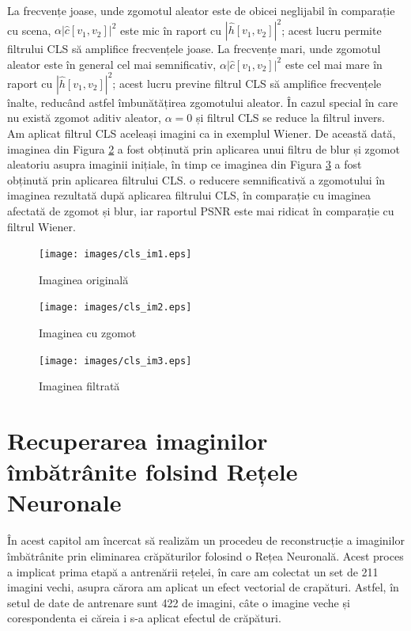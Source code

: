 \documentclass[12pt]{article}
\begin{document}
La frecvențe joase, unde zgomotul aleator este de obicei neglijabil în comparație cu scena, ${\alpha |\hat{c}[v_1, v_2]|^2}$ este mic în raport cu ${|\hat{h}[v_1, v_2]|^2}$; acest lucru permite filtrului CLS să amplifice frecvențele joase. La frecvențe mari, unde zgomotul aleator este în general cel mai semnificativ, ${\alpha |\hat{c}[v_1, v_2]|^2}$ este cel mai mare în raport cu ${|\hat{h}[v_1, v_2]|^2}$; acest lucru previne filtrul CLS să amplifice frecvențele înalte, reducând astfel îmbunătățirea zgomotului aleator. În cazul special în care nu există zgomot aditiv aleator, ${\alpha=0}$ și filtrul CLS se reduce la filtrul invers. \\

Am aplicat filtrul CLS aceleași imagini ca in exemplul Wiener. De această dată, imaginea din Figura \ref{fig:img6} a fost obținută prin aplicarea unui filtru de blur și zgomot aleatoriu asupra imaginii inițiale, în timp ce imaginea din Figura \ref{fig:img7} a fost obținută prin aplicarea filtrului CLS. o reducere semnificativă a zgomotului în imaginea rezultată după aplicarea filtrului CLS, în comparație cu imaginea afectată de zgomot și blur, iar raportul PSNR este mai ridicat în comparație cu filtrul Wiener.
\newpage

\begin{figure}[h!]
    \centering
    \texttt{[image: images/cls\_im1.eps]}
    \caption{Imaginea originală}
    \label{fig:img5}
\end{figure}
\begin{figure}[h!]
    \centering
    \texttt{[image: images/cls\_im2.eps]}
    \caption{Imaginea cu zgomot}
    \label{fig:img6}
\end{figure}
\begin{figure}[h!]
    \centering
    \texttt{[image: images/cls\_im3.eps]}
    \caption{Imaginea filtrată}
    \label{fig:img7}
\end{figure}
\newpage


\section{Recuperarea imaginilor îmbătrânite folsind Rețele Neuronale}
\label{sec:Recuperarea_imaginilor}

\indent În acest capitol am încercat să realizăm un procedeu de reconstrucție a imaginilor îmbătrânite prin eliminarea crăpăturilor folosind o Rețea Neuronală. Acest proces a implicat prima etapă a antrenării rețelei, în care am colectat un set de 211 imagini vechi, asupra cărora am aplicat un efect vectorial de crapături. Astfel, în setul de date de antrenare sunt 422 de imagini, câte o imagine veche și corespondenta ei căreia i s-a aplicat efectul de crăpături.
\end{document}
